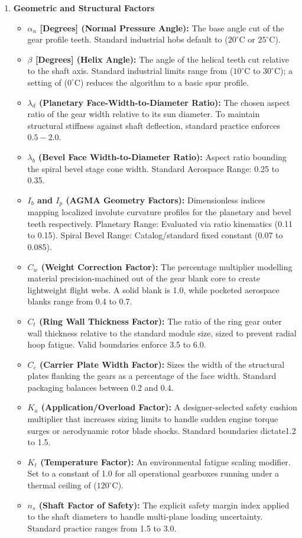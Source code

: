 \begin{enumerate}
            \item \textbf{Geometric and Structural Factors}\par
            	\begin{itemize}
                    \item \textbf{$\alpha_n$ [Degrees] (Normal Pressure Angle):} The base angle cut of the gear profile teeth. Standard industrial hobs default to ($20^\circ\text{C}$ or $25^\circ\text{C}$).
                    \item \textbf{$\beta$ [Degrees] (Helix Angle):} The angle of the helical teeth cut relative to the shaft axis. Standard industrial limits range from ($10^\circ\text{C}$ to $30^\circ\text{C}$); a setting of ($0^\circ\text{C}$) reduces the algorithm to a basic spur profile.
			        \item \textbf{$\lambda_d$ (Planetary Face-Width-to-Diameter Ratio):} The chosen aspect ratio of the gear width relative to its sun diameter. To maintain structural stiffness against shaft deflection, standard practice enforces $0.5-2.0$.
			        \item \textbf{$\lambda_b$ (Bevel Face Width-to-Diameter Ratio):} Aspect ratio bounding the spiral bevel stage cone width. Standard Aerospace Range: 0.25 to 0.35.
			        \item \textbf{$I_b$ and $I_p$ (AGMA Geometry Factors):} Dimensionless indices mapping localized involute curvature profiles for the planetary and bevel teeth respectively. Planetary Range: Evaluated via ratio kinematics (0.11 to 0.15). Spiral Bevel Range: Catalog/standard fixed constant (0.07 to 0.085).
			        \item \textbf{$C_w$ (Weight Correction Factor):} The percentage multiplier modelling material precision-machined out of the gear blank core to create lightweight flight webs. A solid blank is 1.0, while pocketed aerospace blanks range from 0.4 to 0.7.
			        \item \textbf{$C_t$ (Ring Wall Thickness Factor):} The ratio of the ring gear outer wall thickness relative to the standard module size, sized to prevent radial hoop fatigue. Valid boundaries enforce 3.5 to 6.0.
			        \item \textbf{$C_c$ (Carrier Plate Width Factor):} Sizes the width of the structural plates flanking the gears as a percentage of the face width. Standard packaging balances between 0.2 and 0.4.
			        \item \textbf{$K_a$ (Application/Overload Factor):} A designer-selected safety cushion multiplier that increases sizing limits to handle sudden engine torque surges or aerodynamic rotor blade shocks. Standard boundaries dictate1.2 to 1.5.
			        \item \textbf{$K_t$ (Temperature Factor):} An environmental fatigue scaling modifier. Set to a constant of 1.0 for all operational gearboxes running under a thermal ceiling of ($120^\circ\text{C}$).
			        \item \textbf{$n_s$ (Shaft Factor of Safety):} The explicit safety margin index applied to the shaft diameters to handle multi-plane loading uncertainty. Standard practice ranges from 1.5 to 3.0.
                \end{itemize}


\end{enumerate}
